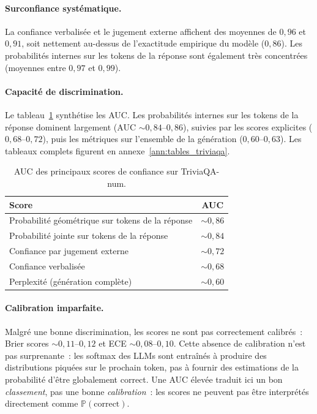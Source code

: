 \documentclass[12pt,a4paper]{article}
\begin{document}
\paragraph{Surconfiance systématique.}
La confiance verbalisée et le jugement externe affichent des moyennes de $0{,}96$ et $0{,}91$, soit nettement au-dessus de l'exactitude empirique du modèle ($0{,}86$). Les probabilités internes sur les tokens de la réponse sont également très concentrées (moyennes entre $0{,}97$ et $0{,}99$).

\paragraph{Capacité de discrimination.}
Le tableau~\ref{tab:auc_synthese_triviaqa} synthétise les AUC. Les probabilités internes sur les tokens de la réponse dominent largement (AUC $\sim 0{,}84$--$0{,}86$), suivies par les scores explicites ($0{,}68$--$0{,}72$), puis les métriques sur l'ensemble de la génération ($0{,}60$--$0{,}63$). Les tableaux complets figurent en annexe~\ref{ann:tables_triviaqa}.

\begin{table}[H]
\centering
\caption{AUC des principaux scores de confiance sur TriviaQA-num.}
\label{tab:auc_synthese_triviaqa}
\small
\begin{tabular}{lc}
\toprule
Score & AUC \\
\midrule
Probabilité géométrique sur tokens de la réponse & $\sim 0{,}86$ \\
Probabilité jointe sur tokens de la réponse & $\sim 0{,}84$ \\
Confiance par jugement externe & $\sim 0{,}72$ \\
Confiance verbalisée & $\sim 0{,}68$ \\
Perplexité (génération complète) & $\sim 0{,}60$ \\
\bottomrule
\end{tabular}
\end{table}

\paragraph{Calibration imparfaite.}
Malgré une bonne discrimination, les scores ne sont pas correctement calibrés~: Brier scores $\sim 0{,}11$--$0{,}12$ et ECE $\sim 0{,}08$--$0{,}10$. Cette absence de calibration n'est pas surprenante~: les softmax des LLMs sont entraînés à produire des distributions piquées sur le prochain token, pas à fournir des estimations de la probabilité d'être globalement correct. Une AUC élevée traduit ici un bon \emph{classement}, pas une bonne \emph{calibration}~: les scores ne peuvent pas être interprétés directement comme $\mathbb{P}(\text{correct})$.
\end{document}
